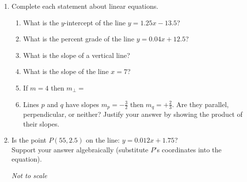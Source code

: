 \begin{enumerate}
\item Complete each statement about linear equations.
\begin{enumerate}[itemsep=0.5cm]
  \item What is the $y$-intercept of the line $y = 1.25x - 13.5$?
  \item What is the percent grade of the line $\displaystyle y = 0.04x + 12.5$?
  \item What is the slope of a vertical line?
  \item What is the slope of the line $x=7$?

    \item If $m = 4$ then $m_{\perp}=$
    \item Lines $p$ and $q$ have slopes $m_p = -\frac{3}{2}$ then $m_q= +\frac{2}{3}$. Are they parallel, perpendicular, or neither? Justify your answer by showing the product of their slopes.
  \end{enumerate}

\item Is the point $P(55,2.5)$ on the line: $y=0.012x+1.75$? \\[0.5cm]
Support your answer algebraically (substitute $P$'s coordinates into the equation).
\begin{flushright}
  \emph{Not to scale}\\
  \end{flushright}


\end{enumerate}
